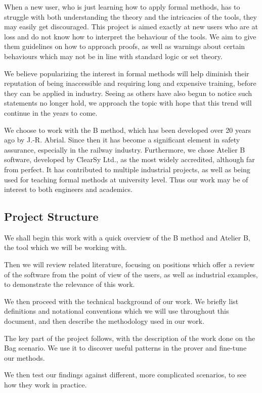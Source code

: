 \documentclass[12pt,journal,duplex]{IEEEtran}
\begin{document}
	When a new user, who is just learning how to apply formal methods, has to struggle with both understanding the theory and the intricacies of the tools, they may easily get discouraged. This project is aimed exactly at new users who are at loss and do not know how to interpret the behaviour of the tools. We aim to give them guidelines on how to approach proofs, as well as warnings about certain behaviours which may not be in line with standard logic or set theory.

	We believe popularizing the interest in formal methods will help diminish their reputation of being inaccessible and requiring long and expensive training, before they can be applied in industry. Seeing as others have also begun to notice such statements no longer hold\cite{amazon}, we approach the topic with hope that this trend will continue in the years to come.

	We choose to work with the B method, which has been developed over 20 years ago by J.-R. Abrial. Since then it has become a significant element in safety assurance, especially in the railway industry. Furthermore, we chose Atelier B software, developed by ClearSy Ltd., as the most widely accredited, although far from perfect. It has contributed to multiple industrial projects, as well as being used for teaching formal methods at university level. Thus our work may be of interest to both engineers and academics.

	\subsection{Project Structure}
	We shall begin this work with a quick overview of the B method and Atelier B, the tool which we will be working with.

	Then we will review related literature, focusing on positions which offer a review of the software from the point of view of the users, as well as industrial examples, to demonstrate the relevance of this work.

	We then proceed with the technical background of our work. We briefly list definitions and notational conventions which we will use throughout this document, and then describe the methodology used in our work.

	The key part of the project follows, with the description of the work done on the Bag scenario. We use it to discover useful patterns in the prover and fine-tune our methods.

	We then test our findings against different, more complicated scenarios, to see how they work in practice.
\end{document}
